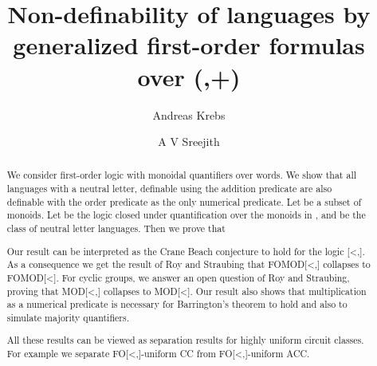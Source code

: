 \documentclass[envcountsame]{llncs}
\begin{document}
\title{Non-definability of languages by generalized first-order formulas over (,+)}
\author{Andreas Krebs  \and
A V Sreejith}


\maketitle


\begin{abstract}
We consider first-order logic with monoidal quantifiers over words. We show that all languages with a neutral letter, definable using the 
addition predicate are also definable with the order predicate as the only numerical predicate. Let  be a subset of monoids.
Let  be the logic closed under quantification over the monoids in , and  be the class of neutral letter languages.
Then we prove that 

Our result can be interpreted as the Crane Beach conjecture to hold for the logic [\textless,].
As a consequence we get the result of Roy and Straubing that
FOMOD[\textless,] collapses to FOMOD[\textless]. For cyclic groups, we answer an open question of Roy and Straubing, proving that MOD[\textless,] collapses to MOD[\textless].
Our result also shows that multiplication as a numerical predicate is necessary for Barrington's theorem to hold and also to simulate
majority quantifiers.

All these results can be viewed as separation results for highly uniform circuit classes. For example we separate 
FO[\textless,]-uniform CC from FO[\textless,]-uniform ACC.
\end{abstract}
\end{document}
